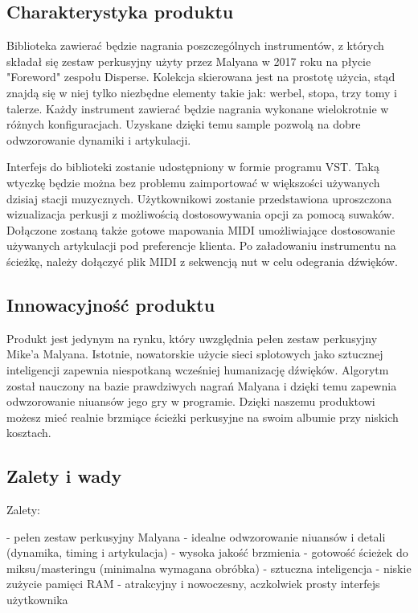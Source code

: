 \documentclass[12pt]{article}
\begin{document}
\subsection{Charakterystyka produktu}

Biblioteka zawierać będzie nagrania poszczególnych instrumentów, z których
składał się zestaw perkusyjny użyty przez Malyana w 2017 roku na płycie
"Foreword" zespołu Disperse. Kolekcja skierowana jest na prostotę użycia, stąd
znajdą się w niej tylko niezbędne elementy takie jak: werbel, stopa, trzy tomy
i talerze. Każdy instrument zawierać będzie nagrania wykonane wielokrotnie w
różnych konfiguracjach. Uzyskane dzięki temu sample pozwolą na dobre
odwzorowanie dynamiki i artykulacji.

Interfejs do biblioteki zostanie udostępniony w formie programu VST. Taką
wtyczkę będzie można bez problemu zaimportować w większości używanych dzisiaj
stacji muzycznych. Użytkownikowi zostanie przedstawiona uproszczona
wizualizacja perkusji z możliwością dostosowywania opcji za pomocą suwaków.
Dołączone zostaną także gotowe mapowania MIDI umożliwiające dostosowanie
używanych artykulacji pod preferencje klienta. Po załadowaniu instrumentu na
ścieżkę, należy dołączyć plik MIDI z sekwencją nut w celu odegrania dźwięków.

\subsection{Innowacyjność produktu}

Produkt jest jedynym na rynku, który uwzględnia pełen zestaw perkusyjny Mike'a
Malyana. Istotnie, nowatorskie użycie sieci splotowych jako sztucznej
inteligencji zapewnia niespotkaną wcześniej humanizację dźwięków. Algorytm
został nauczony na bazie prawdziwych nagrań Malyana i dzięki temu zapewnia
odwzorowanie niuansów jego gry w programie. Dzięki naszemu produktowi możesz
mieć realnie brzmiące ścieżki perkusyjne na swoim albumie przy niskich
kosztach.

\subsection{Zalety i wady}

Zalety:

- pełen zestaw perkusyjny Malyana
- idealne odwzorowanie niuansów i detali (dynamika, timing i artykulacja)
- wysoka jakość brzmienia
- gotowość ścieżek do miksu/masteringu (minimalna wymagana obróbka)
- sztuczna inteligencja
- niskie zużycie pamięci RAM
- atrakcyjny i nowoczesny, aczkolwiek prosty interfejs użytkownika
\end{document}

